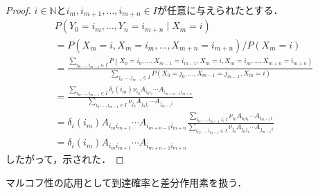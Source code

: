 \documentclass[dvipdfmx,autodetect-engine]{jsarticle}
\theoremstyle{remark}
\theoremstyle{definition}
\newcommand{\N}{\mathbb{N}}
\begin{document}
\begin{proof}
    $i \in \N$と$i_m,i_{m+1},\ldots,i_{m+n} \in I$が任意に与えられたとする．
    \begin{align}
        &P(Y_0 = i_m ,\ldots, Y_n = i_{m+n} \mid X_m = i) \\
        &= P(X_m = i,X_m = i_m,\ldots,X_{m+n}=i_{m+n}) / P(X_m = i) \\
        &= \frac{\sum_{i_0,\ldots,i_{m-1} \in I} P(X_0 = i_0,\ldots, 
        X_{m-1} = i_{m-1},X_m = i,X_m = i_m,\ldots,X_{m+n}=i_{m+n})}{\sum_{j_0,\ldots,j_{m-1} 
        \in I} P(X_0 = j_0,\ldots, X_{m-1} = j_{m-1},X_m = i)}\\
        &= \frac{\sum_{i_0,\ldots,i_{m-1} \in I} \delta_{i}(i_m) 
         \nu_{i_0} A_{i_0 i_1} \cdots A_{i_{m+n-1}{i_{m+n}}}}{\sum_{i_0,\ldots,i_{m-1} \in I} 
         \nu_{j_0} A_{j_0 j_1} \cdots A_{j_{m-1} i}} \\
        &= \delta_{i}(i_m) A_{i_{m} i_{m+1}} \cdots A_{i_{m+n-1} i_{m+n}} \frac{\sum_{i_0,\ldots,i_{m-1} \in I} 
        \nu_{i_0} A_{i_0 i_1} \cdots A_{i_{m-1} i}}{\sum_{i_0,\ldots,i_{m-1} \in I} 
        \nu_{j_0} A_{j_0 j_1} \cdots A_{j_{m-1} i}} \\
        &= \delta_{i}(i_m) A_{i_{m} i_{m+1}} \cdots A_{i_{m+n-1} i_{m+n}}
    \end{align}
    したがって，示された．
\end{proof}

マルコフ性の応用として到達確率と差分作用素を扱う．
\end{document}
